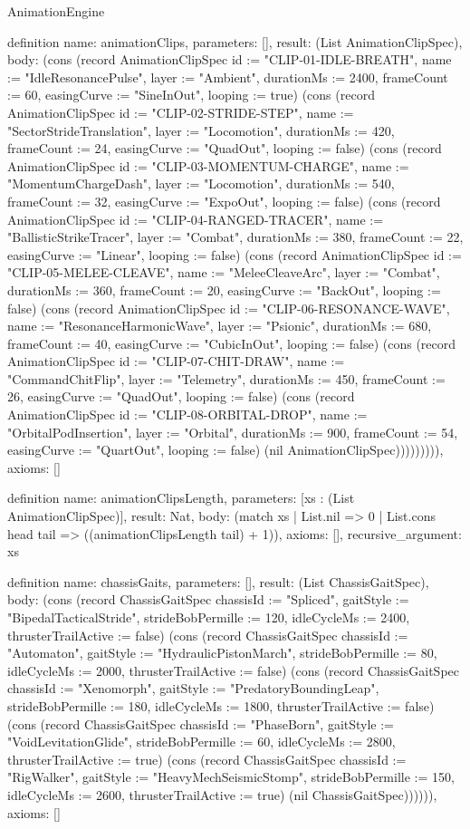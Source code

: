\begin{lexlean}{AnimationEngine}
\begin{semanticmodule}
definition{
  name: animationClips,
  parameters: [],
  result: (List AnimationClipSpec),
  body: (cons (record AnimationClipSpec {id := "CLIP-01-IDLE-BREATH", name := "IdleResonancePulse", layer := "Ambient", durationMs := 2400, frameCount := 60, easingCurve := "SineInOut", looping := true}) (cons (record AnimationClipSpec {id := "CLIP-02-STRIDE-STEP", name := "SectorStrideTranslation", layer := "Locomotion", durationMs := 420, frameCount := 24, easingCurve := "QuadOut", looping := false}) (cons (record AnimationClipSpec {id := "CLIP-03-MOMENTUM-CHARGE", name := "MomentumChargeDash", layer := "Locomotion", durationMs := 540, frameCount := 32, easingCurve := "ExpoOut", looping := false}) (cons (record AnimationClipSpec {id := "CLIP-04-RANGED-TRACER", name := "BallisticStrikeTracer", layer := "Combat", durationMs := 380, frameCount := 22, easingCurve := "Linear", looping := false}) (cons (record AnimationClipSpec {id := "CLIP-05-MELEE-CLEAVE", name := "MeleeCleaveArc", layer := "Combat", durationMs := 360, frameCount := 20, easingCurve := "BackOut", looping := false}) (cons (record AnimationClipSpec {id := "CLIP-06-RESONANCE-WAVE", name := "ResonanceHarmonicWave", layer := "Psionic", durationMs := 680, frameCount := 40, easingCurve := "CubicInOut", looping := false}) (cons (record AnimationClipSpec {id := "CLIP-07-CHIT-DRAW", name := "CommandChitFlip", layer := "Telemetry", durationMs := 450, frameCount := 26, easingCurve := "QuadOut", looping := false}) (cons (record AnimationClipSpec {id := "CLIP-08-ORBITAL-DROP", name := "OrbitalPodInsertion", layer := "Orbital", durationMs := 900, frameCount := 54, easingCurve := "QuartOut", looping := false}) (nil AnimationClipSpec))))))))),
  axioms: []
}

definition{
  name: animationClipsLength,
  parameters: [xs : (List AnimationClipSpec)],
  result: Nat,
  body: (match xs
    | List.nil => 0
    | List.cons head tail => ((animationClipsLength tail) + 1)),
  axioms: [],
  recursive_argument: xs
}

definition{
  name: chassisGaits,
  parameters: [],
  result: (List ChassisGaitSpec),
  body: (cons (record ChassisGaitSpec {chassisId := "Spliced", gaitStyle := "BipedalTacticalStride", strideBobPermille := 120, idleCycleMs := 2400, thrusterTrailActive := false}) (cons (record ChassisGaitSpec {chassisId := "Automaton", gaitStyle := "HydraulicPistonMarch", strideBobPermille := 80, idleCycleMs := 2000, thrusterTrailActive := false}) (cons (record ChassisGaitSpec {chassisId := "Xenomorph", gaitStyle := "PredatoryBoundingLeap", strideBobPermille := 180, idleCycleMs := 1800, thrusterTrailActive := false}) (cons (record ChassisGaitSpec {chassisId := "PhaseBorn", gaitStyle := "VoidLevitationGlide", strideBobPermille := 60, idleCycleMs := 2800, thrusterTrailActive := true}) (cons (record ChassisGaitSpec {chassisId := "RigWalker", gaitStyle := "HeavyMechSeismicStomp", strideBobPermille := 150, idleCycleMs := 2600, thrusterTrailActive := true}) (nil ChassisGaitSpec)))))),
  axioms: []
}


\end{semanticmodule}
\end{lexlean}
